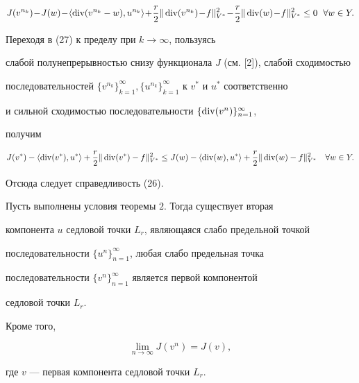 \begin{pf}
\begin{equation}
J(v^{n_{k}})\! -\! J(w)\! -\! {\langle \Div(v^{n_{k}}-w),u^{n_{k}} \rangle} 


\!+\! \frac{r}{2}\|\Div (v^{n_{k}})\! -\! f\|^{2}_{V^{*}}\! - \!


\frac{r}{2}\|\Div (w)\! -\! f\|^{2}_{V^{*}} 


\le 0 \ \; \forall w \in Y.


\end{equation}


Переходя в (27) к пределу при $k \to \infty$, пользуясь


слабой полунепрерывностью снизу функционала $J$ (см. [2]), слабой сходимостью 


последовательностей $ \{ v^{n_{k}} \}_{k=1}^{\infty}, 


\{ u^{n_{k}} \}_{k=1}^{\infty} $ к $v^{*}$ и $u^{*}$ соответственно 


и сильной сходимостью последовательности $ \{\operatorname{div} (v^{n})\}_{n=1}^{\infty}$, 


получим


$$


J(v^{*}) - \langle \Div (v^{*}),u^{*} \rangle + \frac{r}{2}


\|\Div (v^{*}) - f\|^{2}_{V^{*}} \le


J(w) - \langle \Div (w),u^{*} \rangle + 


\frac{r}{2}\|\Div (w) - f\|^{2}_{V^{*}} 


\quad \forall w \in Y.


$$


Отсюда следует справедливость (26).


\end{pf}


 


\begin{thm} Пусть выполнены условия теоремы $2$. Тогда существует вторая 


компонента $u$ седловой точки $L_{r}$, являющаяся слабо предельной точкой 


последовательности $\{u^{n}\}_{n=1}^{\infty}$, любая слабо предельная точка 


последовательности $\{v^{n}\}_{n=1}^{\infty}$ является первой компонентой 


седловой точки $L_{r}$.


Кроме того, 


\begin{equation}


\lim_{n \to \infty} J(v^{n}) = J(v),


\end{equation}


где $v$ --- первая компонента седловой точки $L_{r}$.


\end{thm}


